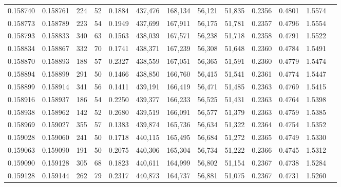 \begin{tabular}{rrrrrrrrrrrrr}
0.158740 & 0.158761 &   224 &  52 &                                     0.1884 & 437,476 & 168,134 &  56,121 &  51,835 & 0.2356 & 0.4801 & 1.5574 \\
0.158773 & 0.158789 &   223 &  54 &                                     0.1949 & 437,699 & 167,911 &  56,175 &  51,781 & 0.2357 & 0.4796 & 1.5554 \\
0.158793 & 0.158833 &   340 &  63 &                                     0.1563 & 438,039 & 167,571 &  56,238 &  51,718 & 0.2358 & 0.4791 & 1.5522 \\
0.158834 & 0.158867 &   332 &  70 &                                     0.1741 & 438,371 & 167,239 &  56,308 &  51,648 & 0.2360 & 0.4784 & 1.5491 \\
0.158870 & 0.158893 &   188 &  57 &                                     0.2327 & 438,559 & 167,051 &  56,365 &  51,591 & 0.2360 & 0.4779 & 1.5474 \\
0.158894 & 0.158899 &   291 &  50 &                                     0.1466 & 438,850 & 166,760 &  56,415 &  51,541 & 0.2361 & 0.4774 & 1.5447 \\
0.158899 & 0.158914 &   341 &  56 &                                     0.1411 & 439,191 & 166,419 &  56,471 &  51,485 & 0.2363 & 0.4769 & 1.5415 \\
0.158916 & 0.158937 &   186 &  54 &                                     0.2250 & 439,377 & 166,233 &  56,525 &  51,431 & 0.2363 & 0.4764 & 1.5398 \\
0.158938 & 0.158962 &   142 &  52 &                                     0.2680 & 439,519 & 166,091 &  56,577 &  51,379 & 0.2363 & 0.4759 & 1.5385 \\
0.158969 & 0.159027 &   355 &  57 &                                     0.1383 & 439,874 & 165,736 &  56,634 &  51,322 & 0.2364 & 0.4754 & 1.5352 \\
0.159028 & 0.159060 &   241 &  50 &                                     0.1718 & 440,115 & 165,495 &  56,684 &  51,272 & 0.2365 & 0.4749 & 1.5330 \\
0.159063 & 0.159090 &   191 &  50 &                                     0.2075 & 440,306 & 165,304 &  56,734 &  51,222 & 0.2366 & 0.4745 & 1.5312 \\
0.159090 & 0.159128 &   305 &  68 &                                     0.1823 & 440,611 & 164,999 &  56,802 &  51,154 & 0.2367 & 0.4738 & 1.5284 \\
0.159128 & 0.159144 &   262 &  79 &                                     0.2317 & 440,873 & 164,737 &  56,881 &  51,075 & 0.2367 & 0.4731 & 1.5260 \\

\end{tabular}
